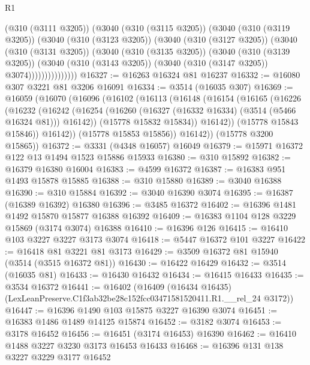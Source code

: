 \begin{lexlean}{R1}
\begin{coremodule}
                (@310 (@3111 @3205))
                (@3040
                  (@310 (@3115 @3205))
                  (@3040
                    (@310 (@3119 @3205))
                    (@3040
                      (@310 (@3123 @3205))
                      (@3040
                        (@310 (@3127 @3205))
                        (@3040
                          (@310 (@3131 @3205))
                          (@3040
                            (@310 (@3135 @3205))
                            (@3040
                              (@310 (@3139 @3205))
                              (@3040
                                (@310 (@3143 @3205))
                                (@3040 (@310 (@3147 @3205)) @3074)))))))))))))))
@16327 := @16263 @16324 @81 @16237
@16332 := @16080 @307 @3221 @81 @3206 @16091
@16334 := @3514 (@16035 @307)
@16369 := @16059
    (@16070
      (@16096
        (@16102
          (@16113
            (@16148
              (@16154
                (@16165
                  (@16226
                    (@16232
                      (@16242
                        (@16254 (@16260 (@16327 (@16332 @16334) (@3514 (@5466 @16324 @81))) @16142))
                        (@15778 @15832 @15834))
                      @16142))
                  (@15778 @15843 @15846))
                @16142))
            (@15778 @15853 @15856))
          @16142))
      (@15778 @3200 @15865))
@16372 := @3331 (@4348 @16057) @16049
@16379 := @15971 @16372 @122 @13 @1494 @1523 @15886 @15933
@16380 := @310 @15892
@16382 := @16379 @16380 @16004
@16383 := @4599 @16372
@16387 := @16383 @951 @1493 @15878 @15885
@16388 := @310 @15880
@16389 := @3040 @16388
@16390 := @310 @15884
@16392 := @3040 @16390 @3074
@16395 := @16387 (@16389 @16392) @16380
@16396 := @3485 @16372
@16402 := @16396 @1481 @1492 @15870 @15877 @16388 @16392
@16409 := @16383 @1104 @128 @3229 @15869 (@3174 @3074) @16388
@16410 := @16396 @126
@16415 := @16410 @103 @3227 @3227 @3173 @3074
@16418 := @5447 @16372 @101 @3227
@16422 := @16418 @81 @3221 @81 @3173
@16429 := @3509 @16372 @81 @15940 (@3514 (@3515 @16372 @81))
@16430 := @16422 @16429
@16432 := @3514 (@16035 @81)
@16433 := @16430 @16432
@16434 := @16415 @16433
@16435 := @3534 @16372
@16441 := @16402
    (@16409 (@16434 @16435) (LexLeanPreserve.C1f3ab32be28c152fcc03471581520411.R1.__rel_24 @3172))
@16447 := @16396 @1490 @103 @15875 @3227 @16390 @3074
@16451 := @16383 @1486 @1489 @14125 @15874
@16452 := @3182 @3074
@16453 := @3178 @16452
@16456 := @16451 (@3174 @16453) @16390
@16462 := @16410 @1488 @3227 @3230 @3173 @16453 @16433
@16468 := @16396 @131 @138 @3227 @3229 @3177 @16452

\end{coremodule}
\end{lexlean}
